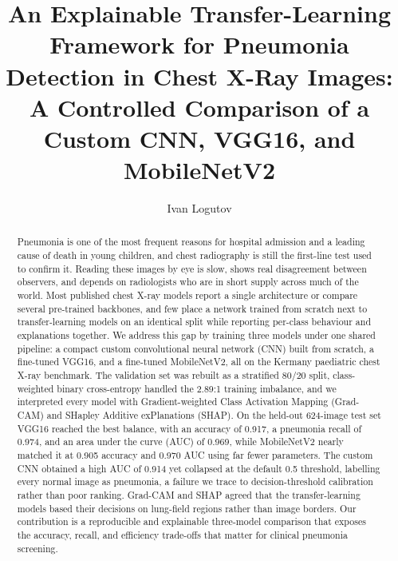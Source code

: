 \documentclass[preprint,12pt]{elsarticle}
\begin{document}
\begin{frontmatter}

\title{An Explainable Transfer-Learning Framework for Pneumonia Detection in Chest X-Ray Images: A Controlled Comparison of a Custom CNN, VGG16, and MobileNetV2}

\author[label1]{Ivan Logutov}

\begin{abstract}
Pneumonia is one of the most frequent reasons for hospital admission and a leading cause of death in young children, and chest radiography is still the first-line test used to confirm it.
Reading these images by eye is slow, shows real disagreement between observers, and depends on radiologists who are in short supply across much of the world.
Most published chest X-ray models report a single architecture or compare several pre-trained backbones, and few place a network trained from scratch next to transfer-learning models on an identical split while reporting per-class behaviour and explanations together.
We address this gap by training three models under one shared pipeline: a compact custom convolutional neural network (CNN) built from scratch, a fine-tuned VGG16, and a fine-tuned MobileNetV2, all on the Kermany paediatric chest X-ray benchmark.
The validation set was rebuilt as a stratified 80/20 split, class-weighted binary cross-entropy handled the 2.89:1 training imbalance, and we interpreted every model with Gradient-weighted Class Activation Mapping (Grad-CAM) and SHapley Additive exPlanations (SHAP).
On the held-out 624-image test set VGG16 reached the best balance, with an accuracy of 0.917, a pneumonia recall of 0.974, and an area under the curve (AUC) of 0.969, while MobileNetV2 nearly matched it at 0.905 accuracy and 0.970 AUC using far fewer parameters.
The custom CNN obtained a high AUC of 0.914 yet collapsed at the default 0.5 threshold, labelling every normal image as pneumonia, a failure we trace to decision-threshold calibration rather than poor ranking.
Grad-CAM and SHAP agreed that the transfer-learning models based their decisions on lung-field regions rather than image borders.
Our contribution is a reproducible and explainable three-model comparison that exposes the accuracy, recall, and efficiency trade-offs that matter for clinical pneumonia screening.
\end{abstract}


\end{frontmatter}
\end{document}
